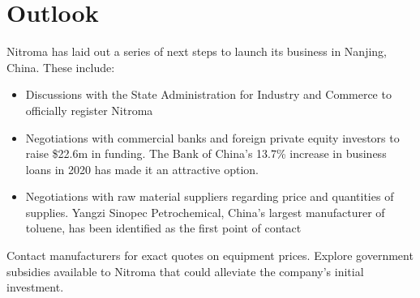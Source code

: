 \section{Outlook}
Nitroma has laid out a series of next steps to launch its business in Nanjing, China. These include:
\begin{itemize}
    \item Discussions with the State Administration for Industry and Commerce to officially register Nitroma 
    \item Negotiations with commercial banks and foreign private equity investors to raise \$22.6m in funding. The Bank of China’s 13.7\% increase in business loans in 2020 has made it an attractive option. 
    \item Negotiations with raw material suppliers regarding price and quantities of supplies. Yangzi Sinopec Petrochemical, China’s largest manufacturer of toluene, has been identified as the first point of contact\cite{sinopec_group_sinopec_2014}
\end{itemize}


Contact manufacturers for exact quotes on equipment prices.
Explore government subsidies available to Nitroma that could alleviate the company’s initial investment. 

